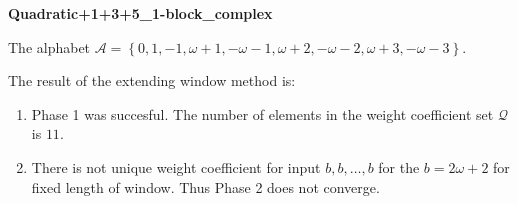 \begin{exmp}
\textbf{ Quadratic+1+3+5\_1-block\_complex }

\label{ex:Quadratic+1+3+51-blockcomplex}

The alphabet $\mathcal{A} =\left\{0, 1, -1, \omega + 1, -\omega - 1, \omega + 2, -\omega - 2, \omega + 3, -\omega - 3\right\}$.

The result of the extending window method is:
\begin{enumerate}
    \item Phase 1 was succesful.
The number of elements in the weight coefficient set $\mathcal{Q}$ is $11$.

    \item There is not unique weight coefficient for input $b,b,\dots,b$ for the $b= 2\omega + 2 $ for fixed length of window. Thus Phase 2 does not converge.

\end{enumerate}
\end{exmp}
